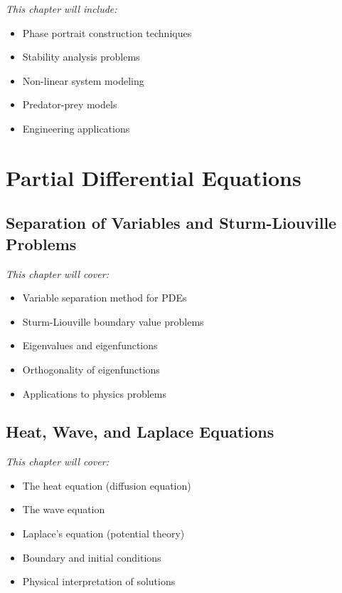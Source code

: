 \documentclass[12pt, letterpaper]{book}
\theoremstyle{problemstyle}
\theoremstyle{solutionstyle}
\begin{document}
\textit{This chapter will include:}
\begin{itemize}
    \item Phase portrait construction techniques
    \item Stability analysis problems
    \item Non-linear system modeling
    \item Predator-prey models
    \item Engineering applications
\end{itemize}

\part{Partial Differential Equations}
\label{part:partial_de}

\chapter{Separation of Variables and Sturm-Liouville Problems}
\label{chap:session_17}

\textit{This chapter will cover:}
\begin{itemize}
    \item Variable separation method for PDEs
    \item Sturm-Liouville boundary value problems
    \item Eigenvalues and eigenfunctions
    \item Orthogonality of eigenfunctions
    \item Applications to physics problems
\end{itemize}

\chapter{Heat, Wave, and Laplace Equations}
\label{chap:session_18}

\textit{This chapter will cover:}
\begin{itemize}
    \item The heat equation (diffusion equation)
    \item The wave equation
    \item Laplace's equation (potential theory)
    \item Boundary and initial conditions
    \item Physical interpretation of solutions
\end{itemize}
\end{document}
